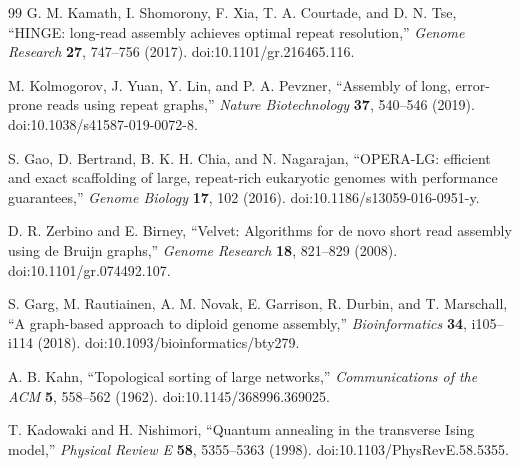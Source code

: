 \documentclass[a4j,10pt]{ujarticle}
\begin{document}
\begin{thebibliography}{99}
G. M. Kamath, I. Shomorony, F. Xia,
T. A. Courtade, and D. N. Tse,
``HINGE: long-read assembly achieves optimal repeat resolution,''
\textit{Genome Research}
\textbf{27}, 747--756 (2017).
doi:10.1101/gr.216465.116.

M. Kolmogorov, J. Yuan, Y. Lin, and P. A. Pevzner,
``Assembly of long, error-prone reads using repeat graphs,''
\textit{Nature Biotechnology}
\textbf{37}, 540--546 (2019).
doi:10.1038/s41587-019-0072-8.

S. Gao, D. Bertrand, B. K. H. Chia, and N. Nagarajan,
``OPERA-LG: efficient and exact scaffolding of large,
repeat-rich eukaryotic genomes with performance guarantees,''
\textit{Genome Biology}
\textbf{17}, 102 (2016).
doi:10.1186/s13059-016-0951-y.


D. R. Zerbino and E. Birney,
``Velvet: Algorithms for de novo short read assembly
using de Bruijn graphs,''
\textit{Genome Research}
\textbf{18}, 821--829 (2008).
doi:10.1101/gr.074492.107.

S. Garg, M. Rautiainen, A. M. Novak, E. Garrison,
R. Durbin, and T. Marschall,
``A graph-based approach to diploid genome assembly,''
\textit{Bioinformatics}
\textbf{34}, i105--i114 (2018).
doi:10.1093/bioinformatics/bty279.


A. B. Kahn,
``Topological sorting of large networks,''
\textit{Communications of the ACM}
\textbf{5}, 558--562 (1962).
doi:10.1145/368996.369025.


T. Kadowaki and H. Nishimori,
``Quantum annealing in the transverse Ising model,''
\textit{Physical Review E}
\textbf{58}, 5355--5363 (1998).
doi:10.1103/PhysRevE.58.5355.



\end{thebibliography}
\end{document}
